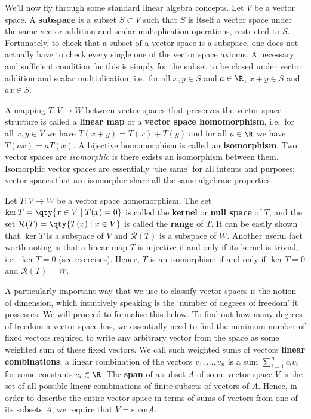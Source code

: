 \vspace{3mm}

We'll now fly through some standard linear algebra concepts. Let \( V \) be a vector space. A \textbf{subspace} is a subset \( S\subset V \) such that \( S \) is itself a vector space under the same vector addition and scalar multiplication operations, restricted to \( S \). Fortunately, to check that a subset of a vector space is a subspace, one does not actually have to check every single one of the vector space axioms. A necessary and sufficient condition for this is simply for the subset to be closed under vector addition and scalar multiplication, i.e.\ for all \( x,y\in S \) and \( a\in\R \), \( x+y\in S \) and \( ax\in S \).

\vspace{3mm}

A mapping \( T:V\to W \) between vector spaces that preserves the vector space structure is called a \textbf{linear map} or a \textbf{vector space homomorphism}, i.e.\ for all \( x,y\in V \) we have \( T(x+y)=T(x)+T(y) \) and for all \( a\in\R \) we have \( T(ax)=aT(x) \). A bijective homomorphism is called an \textbf{isomorphism}. Two vector spaces are \emph{isomorphic} is there exists an isomorphism between them. Isomorphic vector spaces are essentially `the same' for all intents and purposes; vector spaces that are isomorphic share all the same algebraic properties.

\vspace{3mm}

Let \( T:V\to W \) be a vector space homomorphism. The set \( \ker T=\qty{x\in V\mid T(x)=0} \) is called the \textbf{kernel} or \textbf{null space} of \( T \), and the set \( \mathcal{R}(T)=\qty{T(x)\mid x\in V} \) is called the \textbf{range} of \( T \). It can be easily shown that \( \ker T \) is a subspace of \( V \) and \( \mathcal{R}(T) \) is a subspace of \( W \). Another useful fact worth noting is that a linear map \( T \) is injective if and only if its kernel is trivial, i.e.\ \( \ker T=\qty{0} \) (see exercises). Hence, \( T \) is an isomorphism if and only if \( \ker T=\qty{0} \) and \( \mathcal{R}(T)=W \).

\vspace{3mm}

A particularly important way that we use to classify vector spaces is the notion of dimension, which intuitively speaking is the `number of degrees of freedom' it possesses. We will proceed to formalise this below. To find out how many degrees of freedom a vector space has, we essentially need to find the minimum number of fixed vectors required to write any arbitrary vector from the space as some weighted sum of these fixed vectors. We call such weighted sums of vectors \textbf{linear combinations}; a linear combination of the vectors \( v_1,\dots,v_n \) is a sum \( \sum_{i=1}^nc_iv_i \) for some constants \( c_i\in\R \). The \textbf{span} of a subset \( A \) of some vector space \( V \) is the set of all possible linear combinations of finite subsets of vectors of \( A \). Hence, in order to describe the entire vector space in terms of sums of vectors from one of its subsets \( A \), we require that \( V=\text{span}A \).

